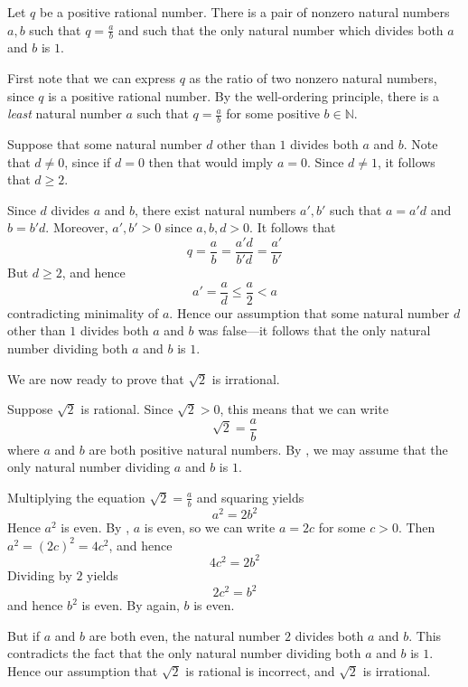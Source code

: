 \begin{lemma}
\label{lemFractionInLowestTerms}
Let $q$ be a positive rational number. There is a pair of nonzero natural numbers $a,b$ such that $q=\frac{a}{b}$ and such that the only natural number which divides both $a$ and $b$ is $1$.
\end{lemma}

\begin{cproof}
First note that we can express $q$ as the ratio of two nonzero natural numbers, since $q$ is a positive rational number. By the well-ordering principle, there is a \textit{least} natural number $a$ such that $q=\frac{a}{b}$ for some positive $b \in \mathbb{N}$.

Suppose that some natural number $d$ other than $1$ divides both $a$ and $b$. Note that $d \ne 0$, since if $d=0$ then that would imply $a=0$. Since $d \ne 1$, it follows that $d \ge 2$.

Since $d$ divides $a$ and $b$, there exist natural numbers $a',b'$ such that $a=a'd$ and $b=b'd$. Moreover, $a',b'>0$ since $a,b,d > 0$. It follows that
\[ q = \frac{a}{b} = \frac{a'd}{b'd} = \frac{a'}{b'} \]
But $d \ge 2$, and hence
\[ a' = \frac{a}{d} \le \frac{a}{2} < a \]
contradicting minimality of $a$. Hence our assumption that some natural number $d$ other than $1$ divides both $a$ and $b$ was false---it follows that the only natural number dividing both $a$ and $b$ is $1$.
\end{cproof}

We are now ready to prove that $\sqrt{2}$ is irrational.

\begin{cproof}
Suppose $\sqrt{2}$ is rational. Since $\sqrt{2}>0$, this means that we can write
\[ \sqrt{2} = \frac{a}{b} \]
where $a$ and $b$ are both positive natural numbers. By , we may assume that the only natural number dividing $a$ and $b$ is $1$.

Multiplying the equation $\sqrt{2} = \frac{a}{b}$ and squaring yields
\[ a^2=2b^2 \]
Hence $a^2$ is even. By , $a$ is even, so we can write $a=2c$ for some $c > 0$. Then $a^2=(2c)^2=4c^2$, and hence
\[ 4c^2=2b^2 \]
Dividing by $2$ yields
\[ 2c^2 = b^2 \]
and hence $b^2$ is even. By  again, $b$ is even.

But if $a$ and $b$ are both even, the natural number $2$ divides both $a$ and $b$. This contradicts the fact that the only natural number dividing both $a$ and $b$ is $1$. Hence our assumption that $\sqrt{2}$ is rational is incorrect, and $\sqrt{2}$ is irrational.
\end{cproof}

